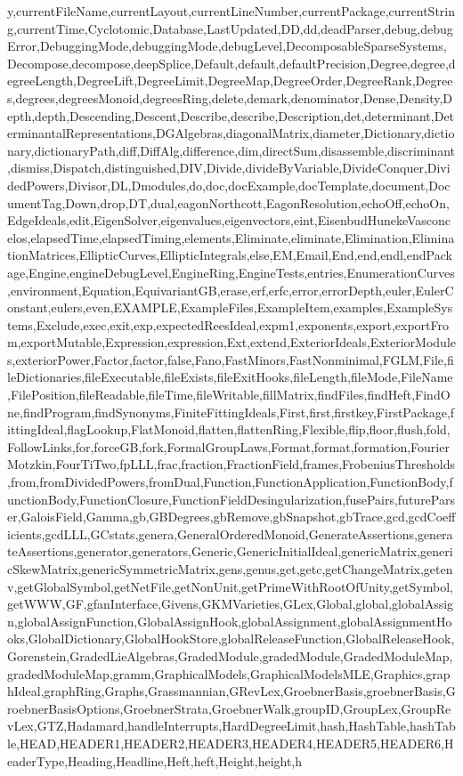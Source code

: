 {y,currentFileName,currentLayout,currentLineNumber,currentPackage,currentString,currentTime,Cyclotomic,Database,LastUpdated,DD,dd,deadParser,debug,debugError,DebuggingMode,debuggingMode,debugLevel,DecomposableSparseSystems,Decompose,decompose,deepSplice,Default,default,defaultPrecision,Degree,degree,degreeLength,DegreeLift,DegreeLimit,DegreeMap,DegreeOrder,DegreeRank,Degrees,degrees,degreesMonoid,degreesRing,delete,demark,denominator,Dense,Density,Depth,depth,Descending,Descent,Describe,describe,Description,det,determinant,DeterminantalRepresentations,DGAlgebras,diagonalMatrix,diameter,Dictionary,dictionary,dictionaryPath,diff,DiffAlg,difference,dim,directSum,disassemble,discriminant,dismiss,Dispatch,distinguished,DIV,Divide,divideByVariable,DivideConquer,DividedPowers,Divisor,DL,Dmodules,do,doc,docExample,docTemplate,document,DocumentTag,Down,drop,DT,dual,eagonNorthcott,EagonResolution,echoOff,echoOn,EdgeIdeals,edit,EigenSolver,eigenvalues,eigenvectors,eint,EisenbudHunekeVasconcelos,elapsedTime,elapsedTiming,elements,Eliminate,eliminate,Elimination,EliminationMatrices,EllipticCurves,EllipticIntegrals,else,EM,Email,End,end,endl,endPackage,Engine,engineDebugLevel,EngineRing,EngineTests,entries,EnumerationCurves,environment,Equation,EquivariantGB,erase,erf,erfc,error,errorDepth,euler,EulerConstant,eulers,even,EXAMPLE,ExampleFiles,ExampleItem,examples,ExampleSystems,Exclude,exec,exit,exp,expectedReesIdeal,expm1,exponents,export,exportFrom,exportMutable,Expression,expression,Ext,extend,ExteriorIdeals,ExteriorModules,exteriorPower,Factor,factor,false,Fano,FastMinors,FastNonminimal,FGLM,File,fileDictionaries,fileExecutable,fileExists,fileExitHooks,fileLength,fileMode,FileName,FilePosition,fileReadable,fileTime,fileWritable,fillMatrix,findFiles,findHeft,FindOne,findProgram,findSynonyms,FiniteFittingIdeals,First,first,firstkey,FirstPackage,fittingIdeal,flagLookup,FlatMonoid,flatten,flattenRing,Flexible,flip,floor,flush,fold,FollowLinks,for,forceGB,fork,FormalGroupLaws,Format,format,formation,FourierMotzkin,FourTiTwo,fpLLL,frac,fraction,FractionField,frames,FrobeniusThresholds,from,fromDividedPowers,fromDual,Function,FunctionApplication,FunctionBody,functionBody,FunctionClosure,FunctionFieldDesingularization,fusePairs,futureParser,GaloisField,Gamma,gb,GBDegrees,gbRemove,gbSnapshot,gbTrace,gcd,gcdCoefficients,gcdLLL,GCstats,genera,GeneralOrderedMonoid,GenerateAssertions,generateAssertions,generator,generators,Generic,GenericInitialIdeal,genericMatrix,genericSkewMatrix,genericSymmetricMatrix,gens,genus,get,getc,getChangeMatrix,getenv,getGlobalSymbol,getNetFile,getNonUnit,getPrimeWithRootOfUnity,getSymbol,getWWW,GF,gfanInterface,Givens,GKMVarieties,GLex,Global,global,globalAssign,globalAssignFunction,GlobalAssignHook,globalAssignment,globalAssignmentHooks,GlobalDictionary,GlobalHookStore,globalReleaseFunction,GlobalReleaseHook,Gorenstein,GradedLieAlgebras,GradedModule,gradedModule,GradedModuleMap,gradedModuleMap,gramm,GraphicalModels,GraphicalModelsMLE,Graphics,graphIdeal,graphRing,Graphs,Grassmannian,GRevLex,GroebnerBasis,groebnerBasis,GroebnerBasisOptions,GroebnerStrata,GroebnerWalk,groupID,GroupLex,GroupRevLex,GTZ,Hadamard,handleInterrupts,HardDegreeLimit,hash,HashTable,hashTable,HEAD,HEADER1,HEADER2,HEADER3,HEADER4,HEADER5,HEADER6,HeaderType,Heading,Headline,Heft,heft,Height,height,h}
